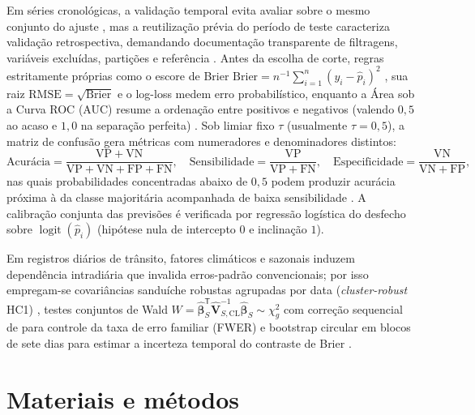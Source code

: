 \documentclass[
  article,
  12pt,
  oneside,
  a4paper,
  section=TITLE,
  english,
  brazil
]{abntex2}\usepackage[]{graphicx}\usepackage[]{xcolor}
\begin{document}
Em séries cronológicas, a validação temporal evita avaliar sobre o mesmo conjunto do ajuste \parencite{hastie2009}, mas a reutilização prévia do período de teste caracteriza validação retrospectiva, demandando documentação transparente de filtragens, variáveis excluídas, partições e referência \parencite{lones2024,kapoor2024}. Antes da escolha de corte, regras estritamente próprias como o escore de Brier $\mathrm{Brier} = n^{-1}\sum_{i=1}^{n}(y_i - \hat{p}_i)^2$ \parencite{brier1950}, sua raiz $\mathrm{RMSE} = \sqrt{\mathrm{Brier}}$ e o log-loss medem erro probabilístico, enquanto a Área sob a Curva ROC (AUC) resume a ordenação entre positivos e negativos (valendo $0{,}5$ ao acaso e $1{,}0$ na separação perfeita) \parencite{james2021,bruce2019}. Sob limiar fixo $\tau$ (usualmente $\tau = 0{,}5$), a matriz de confusão gera métricas com numeradores e denominadores distintos:
{\small
\begin{equation}
  \text{Acurácia} = \frac{\mathrm{VP} + \mathrm{VN}}{\mathrm{VP} + \mathrm{VN} + \mathrm{FP} + \mathrm{FN}}, \quad
  \mathrm{Sensibilidade} = \frac{\mathrm{VP}}{\mathrm{VP} + \mathrm{FN}}, \quad
  \mathrm{Especificidade} = \frac{\mathrm{VN}}{\mathrm{VN} + \mathrm{FP}},
\end{equation}
}
nas quais probabilidades concentradas abaixo de $0{,}5$ podem produzir acurácia próxima à da classe majoritária acompanhada de baixa sensibilidade \parencite{bruce2019,lones2024}. A calibração conjunta das previsões é verificada por regressão logística do desfecho sobre $\operatorname{logit}(\hat{p}_i)$ (hipótese nula de intercepto $0$ e inclinação $1$).

Em registros diários de trânsito, fatores climáticos e sazonais induzem dependência intradiária que invalida erros-padrão convencionais; por isso empregam-se covariâncias sanduíche robustas agrupadas por data (\textit{cluster-robust} HC1) \parencite{zeileis2020}, testes conjuntos de Wald $W = \hat{\boldsymbol{\beta}}_S^{\mathsf{T}} \hat{\mathbf{V}}_{S,\mathrm{CL}}^{-1} \hat{\boldsymbol{\beta}}_S \sim \chi^2_g$ com correção sequencial de \textcite{holm1979} para controle da taxa de erro familiar (FWER) e bootstrap circular em blocos de sete dias para estimar a incerteza temporal do contraste de Brier \parencite{politis1992,efron1993}.

\section{Materiais e métodos}
\end{document}
